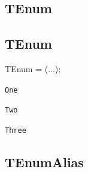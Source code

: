 \documentclass{report}
\newif\ifpdf
\begin{document}
\subsection*{\large{\textbf{TEnum}}\normalsize\hspace{1ex}\hrulefill}
\else
\subsection*{TEnum}
\fi
\label{ok_type_aliases-TEnum}
\begin{list}{}{
\setlength{\itemindent}{0cm}
\setlength{\listparindent}{0cm}
\setlength{\leftmargin}{\evensidemargin}
\addtolength{\leftmargin}{\tmplength}
\settowidth{\labelsep}{X}
\addtolength{\leftmargin}{\labelsep}
\setlength{\labelwidth}{\tmplength}
}
\item[\textbf{Declaration}\hfill]
\ifpdf
\begin{flushleft}
\fi
\begin{ttfamily}
TEnum = (...);\end{ttfamily}

\ifpdf
\end{flushleft}
\fi

\par
\item[\textbf{Description}]
 \item[\textbf{Values}]
\begin{description}
\item[\texttt{One}] \label{ok_type_aliases-One}
\index{}
 
\item[\texttt{Two}] \label{ok_type_aliases-Two}
\index{}
 
\item[\texttt{Three}] \label{ok_type_aliases-Three}
\index{}
 
\end{description}


\end{list}
\ifpdf
\subsection*{\large{\textbf{TEnumAlias}}\normalsize\hspace{1ex}\hrulefill}
\else
\end{document}
